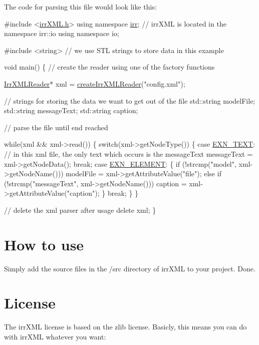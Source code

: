 The code for parsing this file would look like this\+: 
\begin{DoxyCode}
\textcolor{preprocessor}{#include <\hyperlink{irrXML_8h}{irrXML.h}>}
\textcolor{keyword}{using namespace }\hyperlink{namespaceirr}{irr}; \textcolor{comment}{// irrXML is located in the namespace irr::io}
\textcolor{keyword}{using namespace }io;

\textcolor{preprocessor}{#include <string>} \textcolor{comment}{// we use STL strings to store data in this example}

\textcolor{keywordtype}{void} main()
\{
 \textcolor{comment}{// create the reader using one of the factory functions}

 \hyperlink{namespaceirr_1_1io_a1628edbb9d5d53f18c82d2a92b0ad27e}{IrrXMLReader}* xml = \hyperlink{namespaceirr_1_1io_a581f4d4648398759c61266d63d7106b1}{createIrrXMLReader}(\textcolor{stringliteral}{"config.xml"});

 \textcolor{comment}{// strings for storing the data we want to get out of the file}
 std::string modelFile;
 std::string messageText;
 std::string caption;

 \textcolor{comment}{// parse the file until end reached}

 \textcolor{keywordflow}{while}(xml && xml->read())
 \{
     \textcolor{keywordflow}{switch}(xml->getNodeType())
     \{
     \textcolor{keywordflow}{case} \hyperlink{namespaceirr_1_1io_a86a02676c9cbb822e04d60c81b4f33eda0edf973f8ca0f6097f69369539d432a4}{EXN\_TEXT}:
         \textcolor{comment}{// in this xml file, the only text which occurs is the messageText}
         messageText = xml->getNodeData();
         \textcolor{keywordflow}{break};
     \textcolor{keywordflow}{case} \hyperlink{namespaceirr_1_1io_a86a02676c9cbb822e04d60c81b4f33eda9df4f5baccc23a0ad1f6fa64d8de2fc0}{EXN\_ELEMENT}:
         \{
             \textcolor{keywordflow}{if} (!strcmp(\textcolor{stringliteral}{"model"}, xml->getNodeName()))
                 modelFile = xml->getAttributeValue(\textcolor{stringliteral}{"file"});
             \textcolor{keywordflow}{else}
             \textcolor{keywordflow}{if} (!strcmp(\textcolor{stringliteral}{"messageText"}, xml->getNodeName()))
                 caption = xml->getAttributeValue(\textcolor{stringliteral}{"caption"});
         \}
         \textcolor{keywordflow}{break};
     \}
 \}

 \textcolor{comment}{// delete the xml parser after usage}
 \textcolor{keyword}{delete} xml;
\}
\end{DoxyCode}
\hypertarget{index_howto}{}\section{How to use}\label{index_howto}
Simply add the source files in the /src directory of irr\+X\+ML to your project. Done.\hypertarget{index_license}{}\section{License}\label{index_license}
The irr\+X\+ML license is based on the zlib license. Basicly, this means you can do with irr\+X\+ML whatever you want\+:


